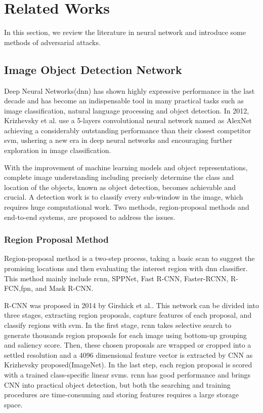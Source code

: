 
\chapter{Related Works}
\label{sec:fundamentals_related-work}
In this section, we review the literature in neural network and introduce some methods of adversarial attacks.
\section{Image Object Detection Network}

Deep Neural Networks(\acrshort{dnn}) has shown highly expressive performance in the last decade and has become an indispensable tool in many practical tasks such as image classification, natural language processing and object detection. In 2012, Krizhevsky et al.\cite{krizhevsky_imagenet_2017} use a 5-layers convolutional neural network named as AlexNet achieving a considerably outstanding performance than their closest competitor \acrshort{svm}, ushering a new era in deep neural networks and encouraging further exploration in image classification. 

With the improvement of machine learning models and object representations, complete image understanding including precisely determine the class and location of the objects, known as object detection, becomes achievable and crucial. A detection work is to classify every sub-window in the image, which requires huge computational work. Two methods, region-proposal methods and end-to-end systems, are proposed to address the issues.
\subsection{Region Proposal Method}
Region-proposal method is a two-step process, taking a basic scan to suggest the promising locations and then evaluating the interest region with \acrshort{dnn} classifier. This method mainly include \acrshort{rcnn}\cite{girshick_rich_2014}, SPPNet\cite{he_spatial_2014}, Fast R-CNN\cite{girshick_fast_2015}, Faster-RCNN\cite{ren_faster_2016}, R-FCN\cite{dai_r-fcn_2016},\acrshort{fpn}\cite{lin_feature_2017}, and Mask R-CNN\cite{he_mask_2018}. 

R-CNN was proposed in 2014 by Girshick et al.\cite{girshick_rich_2014}. This network can be divided into three stages, extracting region proposals, capture features of each proposal, and classify regions with \acrshort{svm}. In the first stage, \acrshort{rcnn} takes selective search\cite{uijlings_selective_2013} to generate thousands region proposals for each image using bottom-up grouping and saliency score. Then, these chosen proposals are wrapped or cropped into a settled resolution and a 4096 dimensional feature vector is extracted by CNN as Krizhevsky proposed(ImageNet\cite{deng_imagenet_2009}). In the last step, each region proposal is scored with a trained class-specific linear \acrshort{svm}s. \acrshort{rcnn} has good performance and brings CNN into practical object detection, but both the searching and training procedures are time-consuming and storing features requires a large storage space.

